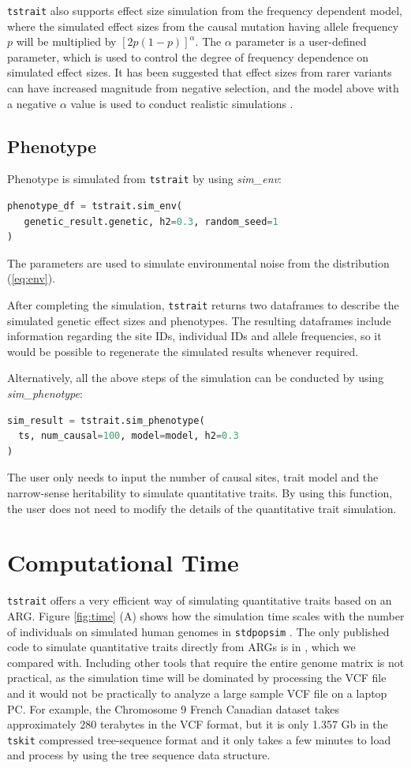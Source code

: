 \documentclass[unnumsec,webpdf,modern,large,namedate]{oup-authoring-template}%
\begin{document}
\texttt{tstrait} also supports effect size simulation from the frequency
dependent model, where the simulated effect sizes from the causal mutation
having allele frequency $p$ will be multiplied by $[2p(1-p)]^\alpha$. The
$\alpha$ parameter is a user-defined parameter, which is used to control the
degree of frequency dependence on simulated effect sizes. It has been suggested
that effect sizes from rarer variants can have increased magnitude from
negative selection, and the model above with a negative $\alpha$ value is used
to conduct realistic simulations \citep{speed2017}.

\subsection{Phenotype}

Phenotype is simulated from \texttt{tstrait} by using \emph{sim\_env}:
\begin{lstlisting}[language=Python]
phenotype_df = tstrait.sim_env(
   genetic_result.genetic, h2=0.3, random_seed=1
)
\end{lstlisting}
The parameters are used to simulate environmental noise from the distribution (\ref{eq:env}).

After completing the simulation, \texttt{tstrait} returns two dataframes to
describe the simulated genetic effect sizes and phenotypes. The resulting
dataframes include information regarding the site IDs, individual IDs and
allele frequencies, so it would be possible to regenerate the simulated results
whenever required.

Alternatively, all the above steps of the simulation can be conducted by using
\emph{sim\_phenotype}:
\begin{lstlisting}[language=Python]
sim_result = tstrait.sim_phenotype(
  ts, num_causal=100, model=model, h2=0.3
)
\end{lstlisting}
The user only needs to input the number of causal sites, trait model and the
narrow-sense heritability to simulate quantitative traits. By using this
function, the user does not need to modify the details of the quantitative
trait simulation.

\section{Computational Time}

\texttt{tstrait} offers a very efficient way of simulating quantitative traits
based on an ARG. Figure \ref{fig:time} (A) shows how the simulation time scales
with the number of individuals on simulated human genomes in \texttt{stdpopsim}
\citep{adrion2020}. The only published code to simulate quantitative traits
directly from ARGs is in \cite{martin2017}, which we compared with. Including
other tools that require the entire genome matrix is not practical, as the
simulation time will be dominated by processing the VCF file and it would not
be practically to analyze a large sample VCF file on a laptop PC. For example,
the Chromosome 9 French Canadian dataset takes approximately 280 terabytes in
the VCF format, but it is only 1.357 Gb in the \texttt{tskit} compressed
tree-sequence format and it only takes a few minutes to load and process by
using the tree sequence data structure.
\end{document}
